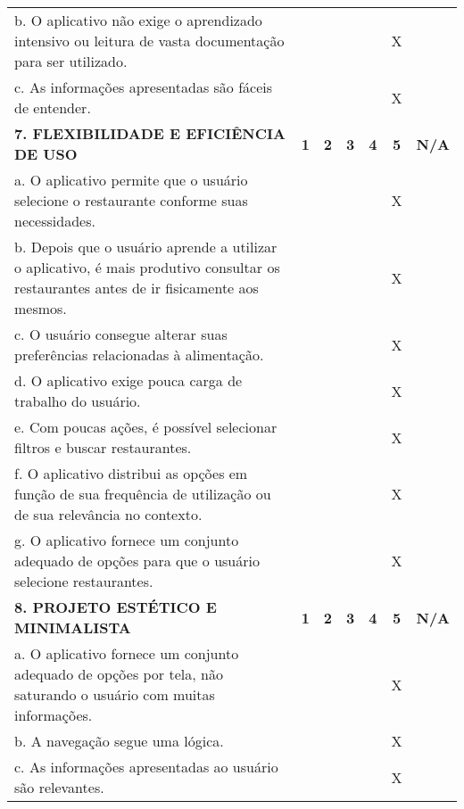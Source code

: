 \documentclass[portuguese,oneside]{tcc}
\begin{document}
\begin{center}
\begin{longtabu}{|L{25em}|c|c|c|c|c|c|}
																																b. O aplicativo não exige o aprendizado intensivo ou leitura de vasta documentação para ser utilizado. & & & & & X & \\ 
																																c. As informações apresentadas são fáceis de entender. & & & & & X & \\ 
																																\textbf{7. FLEXIBILIDADE E EFICIÊNCIA DE USO} & \textbf{1} & \textbf{2} & \textbf{3} & \textbf{4} & \textbf{5} & \textbf{N/A} \\ 
																																a. O aplicativo permite que o usuário selecione o restaurante conforme suas necessidades. & & & & & X & \\ 
																																b. Depois que o usuário aprende a utilizar o aplicativo, é mais produtivo consultar os restaurantes antes de ir fisicamente aos mesmos. & & & & & X & \\ 
																																c. O usuário consegue alterar suas preferências relacionadas à alimentação. & & & & & X & \\ 
																																d. O aplicativo exige pouca carga de trabalho do usuário. & & & & & X & \\ 
																																e. Com poucas ações, é possível selecionar filtros e buscar restaurantes. & & & & & X & \\ 
																																f. O aplicativo distribui as opções em função de sua frequência de utilização ou de sua relevância no contexto.	& & & & & X & \\ 
																																g. O aplicativo fornece um conjunto adequado de opções para que o usuário selecione restaurantes. & & & & & X & \\ 
																																\textbf{8. PROJETO ESTÉTICO E MINIMALISTA} & \textbf{1} & \textbf{2} & \textbf{3} & \textbf{4} & \textbf{5} & \textbf{N/A} \\ 
																																a. O aplicativo fornece um conjunto adequado de opções por tela, não saturando o usuário com muitas informações. & & & & & X & \\ 
																																b. A navegação segue uma lógica. & & & & & X & \\ 
																																c. As informações apresentadas ao usuário são relevantes. & & & & & X & \\ 

\end{longtabu}
\end{center}
\end{document}
